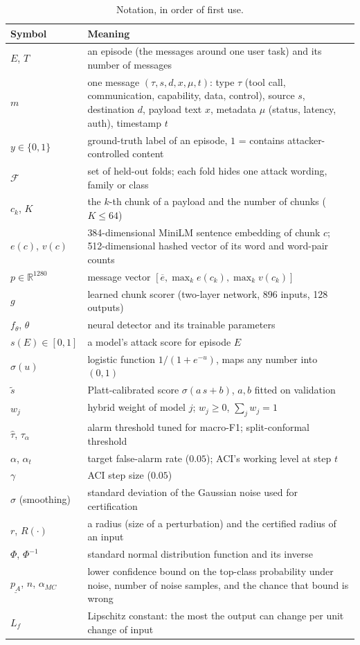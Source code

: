 \documentclass[conference,compsoc]{IEEEtran}
\newcommand{\R}{\mathbb{R}}
\newcommand{\calF}{\mathcal{F}}
\begin{document}
\begin{table}[!t]
\centering
\caption{Notation, in order of first use.}
\label{tab:notation}
\footnotesize
\renewcommand{\arraystretch}{1.08}
\setlength{\tabcolsep}{3pt}
\begin{tabular}{@{}p{1.75cm}p{6.25cm}@{}}
\toprule
\textbf{Symbol} & \textbf{Meaning} \\
\midrule
$E$, $T$ & an episode (the messages around one user task) and its number of messages \\
$m$ & one message $(\tau,s,d,x,\mu,t)$: type $\tau$ (tool call, communication, capability, data, control), source $s$, destination $d$, payload text $x$, metadata $\mu$ (status, latency, auth), timestamp $t$ \\
$y\in\{0,1\}$ & ground-truth label of an episode, $1$ = contains attacker-controlled content \\
$\calF$ & set of held-out folds; each fold hides one attack wording, family or class \\
$c_{k}$, $K$ & the $k$-th chunk of a payload and the number of chunks ($K\le64$) \\
$e(c)$, $v(c)$ & 384-dimensional MiniLM sentence embedding of chunk $c$; 512-dimensional hashed vector of its word and word-pair counts \\
$p\in\R^{1280}$ & message vector $[\overline{e},\max_{k}e(c_{k}),\max_{k}v(c_{k})]$ \\
$g$ & learned chunk scorer (two-layer network, 896 inputs, 128 outputs) \\
$f_{\theta}$, $\theta$ & neural detector and its trainable parameters \\
$s(E)\in[0,1]$ & a model's attack score for episode $E$ \\
$\sigma(u)$ & logistic function $1/(1+e^{-u})$, maps any number into $(0,1)$ \\
$\tilde s$ & Platt-calibrated score $\sigma(a\,s+b)$, $a,b$ fitted on validation \\
$w_{j}$ & hybrid weight of model $j$; $w_{j}\ge0$, $\sum_{j}w_{j}=1$ \\
$\hat\tau$, $\tau_{\alpha}$ & alarm threshold tuned for macro-F1; split-conformal threshold \\
$\alpha$, $\alpha_{t}$ & target false-alarm rate ($0.05$); ACI's working level at step $t$ \\
$\gamma$ & ACI step size ($0.05$) \\
$\sigma$ (smoothing) & standard deviation of the Gaussian noise used for certification \\
$r$, $R(\cdot)$ & a radius (size of a perturbation) and the certified radius of an input \\
$\Phi$, $\Phi^{-1}$ & standard normal distribution function and its inverse \\
$\underline{p_{A}}$, $n$, $\alpha_{MC}$ & lower confidence bound on the top-class probability under noise, number of noise samples, and the chance that bound is wrong \\
$L_{f}$ & Lipschitz constant: the most the output can change per unit change of input \\
\bottomrule
\end{tabular}
\end{table}
\end{document}
